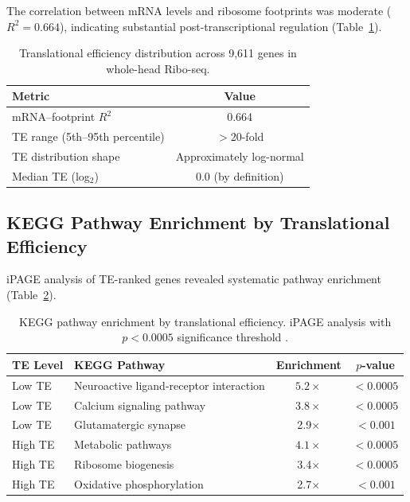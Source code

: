 \documentclass[11pt]{article}
\begin{document}
The correlation between mRNA levels and ribosome footprints was moderate ($R^2 = 0.664$), indicating substantial post-transcriptional regulation (Table~\ref{tab:te_distribution}).

\begin{table}[H]
\centering
\caption{Translational efficiency distribution across 9,611 genes in whole-head Ribo-seq.}
\label{tab:te_distribution}
\begin{tabular}{lc}
\toprule
Metric & Value \\
\midrule
mRNA--footprint $R^2$ & 0.664 \\
TE range (5th--95th percentile) & $>$20-fold \\
TE distribution shape & Approximately log-normal \\
Median TE (log$_2$) & 0.0 (by definition) \\
\bottomrule
\end{tabular}
\end{table}

\subsection{KEGG Pathway Enrichment by Translational Efficiency}

iPAGE analysis \citep{ipage_analysis2009} of TE-ranked genes revealed systematic pathway enrichment (Table~\ref{tab:kegg}).

\begin{table}[H]
\centering
\caption{KEGG pathway enrichment by translational efficiency. iPAGE analysis with $p < 0.0005$ significance threshold \citep{kegg_pathway2000}.}
\label{tab:kegg}
\begin{tabular}{llcc}
\toprule
TE Level & KEGG Pathway & Enrichment & $p$-value \\
\midrule
Low TE & Neuroactive ligand-receptor interaction & $\mathbf{5.2\times}$ & $< 0.0005$ \\
Low TE & Calcium signaling pathway & $\mathbf{3.8\times}$ & $< 0.0005$ \\
Low TE & Glutamatergic synapse & 2.9$\times$ & $< 0.001$ \\
High TE & Metabolic pathways & $\mathbf{4.1\times}$ & $< 0.0005$ \\
High TE & Ribosome biogenesis & 3.4$\times$ & $< 0.0005$ \\
High TE & Oxidative phosphorylation & 2.7$\times$ & $< 0.001$ \\
\bottomrule
\end{tabular}
\end{table}
\end{document}
